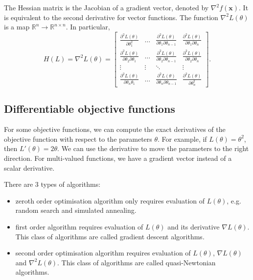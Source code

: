 \documentclass[a4paper, openany]{memoir}
\begin{document}
The Hessian matrix is the Jacobian of a gradient vector, denoted by $\nabla^2 f(\mathbf{x})$. It is equivalent to the second derivative for vector functions. The function $\nabla^2 L(\theta)$ is a map $\mathbb{R}^n \to \mathbb{R}^{n \times n}$. In particular,
\[H(L) = \nabla^2 L(\theta) = \begin{bmatrix}
    \frac{\partial^2 L(\theta)}{\partial \theta_1^2} & \dots & \frac{\partial^2 L(\theta)}{\partial \theta_1 \partial \theta_{n-1}} & \frac{\partial^2 L(\theta)}{\partial \theta_1 \partial \theta_n} \\
    \frac{\partial^2 L(\theta)}{\partial \theta_2 \partial \theta_1} & \dots & \frac{\partial^2 L(\theta)}{\partial \theta_2 \partial \theta_{n-1}} & \frac{\partial^2 L(\theta)}{\partial \theta_2 \partial \theta_n} \\
    \vdots & \vdots & \ddots & \vdots \\
    \frac{\partial^2 L(\theta)}{\partial \theta_n \theta_1} & \dots & \frac{\partial^2 L(\theta)}{\partial \theta_n \partial \theta_{n-1}} & \frac{\partial^2 L(\theta)}{\partial \theta_n^2}
\end{bmatrix}.\]

\subsection{Differentiable objective functions}
For some objective functions, we can compute the exact derivatives of the objective function with respect to the parameters $\theta$. For example, if $L(\theta) = \theta^2$, then $L'(\theta) = 2\theta$. We can use the derivative to move the parameters to the right direction. For multi-valued functions, we have a gradient vector instead of a scalar derivative.

There are 3 types of algorithms:
\begin{itemize}
    \item zeroth order optimisation algorithm only requires evaluation of $L(\theta)$, e.g. random search and simulated annealing.
    \item first order algorithm requires evaluation of $L(\theta)$ and its derivative $\nabla L(\theta)$. This class of algorithms are called gradient descent algorithms.
    \item second order optimisation algorithm requires evaluation of $L(\theta)$, $\nabla L(\theta)$ and $\nabla^2 L(\theta)$. This class of algorithms are called quasi-Newtonian algorithms.
\end{itemize}
\newpage
\end{document}
